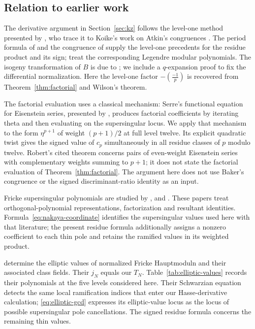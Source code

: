\documentclass[11pt,a4paper]{article}
\numberwithin{equation}{section}
\theoremstyle{definition}
\theoremstyle{remark}
\begin{document}
\subsection{Relation to earlier work}
The derivative argument in Section~\ref{sec:kz} follows the level-one method
presented by \citet[\S10]{KZ98}, who trace it to Koike's work
on Atkin's congruences \citep{Koike73}. The period formula of \citet{dS94}
and the congruence of \citet{Baker98} supply the level-one precedents for the
residue product and its sign; \citet{BL18} treat the corresponding Legendre
modular polynomials. The isogeny transformation of $B$ is due to
\citet[Th\'eor\`eme B, p.~106; \S3.3, Lemma~7 and (19), p.~124]{Robert80};
we include a $q$-expansion proof to fix the differential normalization.
Here the level-one factor $-\left(\frac{-1}{p}\right)$ is recovered from
Theorem~\ref{thm:factorial} and Wilson's theorem.

The factorial evaluation uses a classical mechanism: Serre's functional
equation for Eisenstein series, presented by
\citet[\S2.5, Th\'eor\`eme~2, p.~119]{Robert80}, produces factorial
coefficients by iterating theta and then evaluating on the supersingular
locus. We apply that mechanism to the form $\eta^{p+1}$ of weight
$(p+1)/2$ at full level twelve. Its explicit quadratic twist gives the
signed value of $c_p$ simultaneously in all residue classes of $p$
modulo twelve. Robert's cited theorem concerns pairs of even-weight
Eisenstein series with complementary weights summing to $p+1$; it does
not state the factorial evaluation of Theorem~\ref{thm:factorial}. The argument here does not use
Baker's congruence or the signed discriminant-ratio identity as an input.

Fricke supersingular polynomials are studied by \citet{Sakai11,Sakai14},
\citet{Nakaya19} and \citet{Morton23}. These papers treat
orthogonal-polynomial representations, factorization and resultant
identities. Formula~\eqref{eq:nakaya-coordinate} identifies the supersingular
values used here with that literature; the present residue formula additionally
assigns a nonzero coefficient to each thin pole and retains the ramified values
in its weighted product.

\citet[\S4.2, Table~1 and Appendix~C]{JST19} determine the elliptic values
of normalized Fricke Hauptmoduln and their associated class fields. Their
$j_N$ equals our $T_N$. Table~\ref{tab:elliptic-values} records their
polynomials at the five levels considered here. Their Schwarzian equation
detects the same local ramification indices that enter our Hasse-derivative
calculation; \eqref{eq:elliptic-gcd} expresses its elliptic-value locus as
the locus of possible supersingular pole cancellations. The signed residue
formula concerns the remaining thin values.
\end{document}

